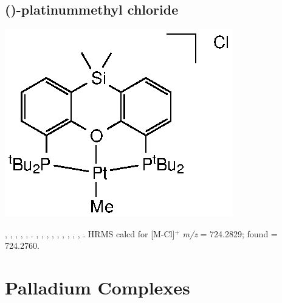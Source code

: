 \subsection*{(\tBuSixantphosk)-platinummethyl chloride}
\begin{structure}[h]
\begin{center}
\includegraphics{../Structures/SitBuPtMe.eps}
\end{center}
\end{structure}

,
,
,
,
,
.
,
,
,
,
,
,
,
,
,
.
HRMS calcd for  [M-Cl]$^+$ \emph{m/z} = 724.2829; found = 724.2760.


\section{Palladium Complexes}
\label{section:experimental:palladium}


